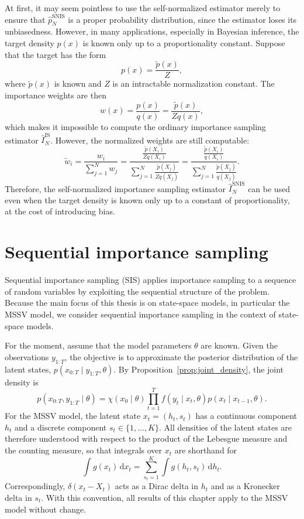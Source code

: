 At first, it may seem pointless to use the self-normalized estimator merely to ensure that $\hat{p}_N^{\mathrm{SNIS}}$ is a proper probability distribution, since the estimator loses its unbiasedness. 
However, in many applications, especially in Bayesian inference, the target density $p(x)$ is known only up to a proportionality constant. Suppose that the target has the form
\begin{equation}
    p(x) = \frac{\tilde{p}(x)}{Z},
\end{equation}
where $\tilde{p}(x)$ is known and $Z$ is an intractable normalization constant. The importance weights are then
\begin{equation}
    w(x) = \frac{p(x)}{q(x)} = \frac{\tilde{p}(x)}{Zq(x)},
\end{equation}
which makes it impossible to compute the ordinary importance sampling estimator $\hat{I}_N^{\mathrm{IS}}$. However, the normalized weights are still computable:
\begin{equation}
    \tilde{w}_i = \frac{w_i}{\sum_{j=1}^N w_j} = \frac{\frac{\tilde{p}(X_i)}{Zq(X_i)}}{\sum_{j=1}^N \frac{\tilde{p}(X_j)}{Zq(X_j)}} = \frac{\frac{\tilde{p}(X_i)}{q(X_i)}}{\sum_{j=1}^N \frac{\tilde{p}(X_j)}{q(X_j)}}.
\end{equation}
Therefore, the self-normalized importance sampling estimator $\hat{I}_N^{\mathrm{SNIS}}$ can be used even when the target density is known only up to a constant of proportionality, at the cost of introducing bias.

\section{Sequential importance sampling}
Sequential importance sampling (SIS) applies importance sampling to a sequence of random variables by exploiting the sequential structure of the problem.
Because the main focus of this thesis is on state-space models, in particular the MSSV model, we consider sequential importance sampling in the context of state-space models.

For the moment, assume that the model parameters $\theta$ are known. Given the observations $y_{1:T}$, the objective is to approximate the posterior distribution of the latent states, $p(x_{0:T} \mid y_{1:T},\theta)$.
By Proposition~\ref{prop:joint_density}, the joint density is
\begin{equation}
p(x_{0:T},y_{1:T}\mid\theta) = \chi(x_0\mid\theta) \prod_{t=1}^T f(y_t\mid x_t,\theta) p(x_t\mid x_{t-1},\theta).
\end{equation}
For the MSSV model, the latent state $x_t = (h_t,s_t)$ has a continuous component $h_t$ and a discrete component $s_t \in \{1,\ldots,K\}$. All densities of the latent states are therefore understood with respect to the product of the Lebesgue measure and the counting measure, so that integrals over $x_t$ are shorthand for
\begin{equation}
    \int g(x_t)\,\mathrm{d}x_t = \sum_{s_t=1}^{K} \int g(h_t,s_t)\,\mathrm{d}h_t.
\end{equation}
Correspondingly, $\delta(x_t - X_t)$ acts as a Dirac delta in $h_t$ and as a Kronecker delta in $s_t$. With this convention, all results of this chapter apply to the MSSV model without change.

